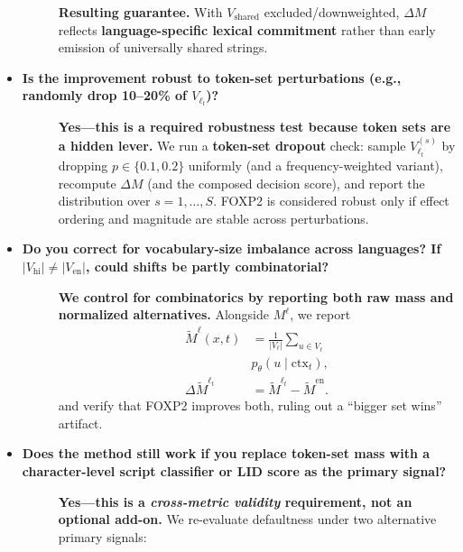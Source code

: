 \begin{itemize}[leftmargin=1.5em]
\begin{description}
\vspace{2pt}
\textbf{Resulting guarantee.} With $V_{\mathrm{shared}}$ excluded/downweighted, $\Delta M$ reflects \textbf{language-specific lexical commitment} rather than early emission of universally shared strings.
\end{description}


\item[\ding{93}] \textbf{Is the improvement robust to token-set perturbations (e.g., randomly drop 10–20\% of $V_{\ell_t}$)?}
\begin{description}
\item[] \textbf{Yes—this is a required robustness test because token sets are a hidden lever.} We run a \textbf{token-set dropout} check: sample $V_{\ell_t}^{(s)}$ by dropping $p\in\{0.1,0.2\}$ uniformly (and a frequency-weighted variant), recompute $\Delta M$ (and the composed decision score), and report the distribution over $s=1,\dots,S$. FOXP2 is considered robust only if effect ordering and magnitude are stable across perturbations.
\end{description}

\item[\ding{93}] \textbf{Do you correct for vocabulary-size imbalance across languages? If $|V_{\mathrm{hi}}|\neq|V_{\mathrm{en}}|$, could shifts be partly combinatorial?}
\begin{description}
\item[] \textbf{We control for combinatorics by reporting both raw mass and normalized alternatives.} Alongside $M^\ell$, we report
\[
\begin{aligned}
\widetilde M^{\ell}(x,t) &= \frac{1}{|V_{\ell}|}\sum_{u\in V_{\ell}}\\
& p_\theta(u\mid \mathrm{ctx}_t),\\
\Delta \widetilde M^{\ell_t} &= \widetilde M^{\ell_t}-\widetilde M^{\mathrm{en}}.
\end{aligned}
\]
and verify that FOXP2 improves both, ruling out a “bigger set wins” artifact.
\end{description}

\item[\ding{93}] \textbf{Does the method still work if you replace token-set mass with a character-level script classifier or LID score as the primary signal?}
\begin{description}
\item[] \textbf{Yes—this is a \emph{cross-metric validity} requirement, not an optional add-on.}
We re-evaluate defaultness under two alternative primary signals:


\end{description}
\end{itemize}

